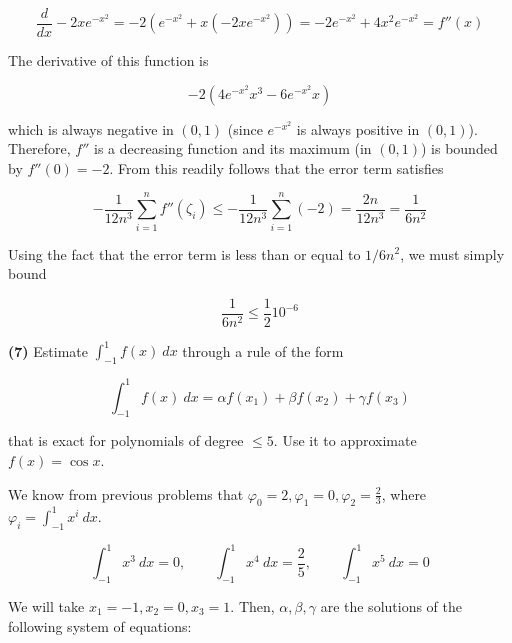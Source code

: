 \documentclass[12pt]{article}
\theoremstyle{definition}
\begin{document}
\begin{equation*}
    \frac{d}{dx} -2xe^{-x^2} = -2\left( e^{-x^2} + x(-2xe^{-x^2}) \right) =
    -2e^{-x^2} + 4x^2e^{-x^2} = f''(x)
\end{equation*}

The derivative of this function is 

\begin{equation*}
    -2(4e^{-x^2}x^3 - 6e^{-x^2}x)
\end{equation*}

which is always negative in $(0, 1)$ (since $e^{-x^2}$ is always positive in
$(0, 1)$). Therefore, $f''$ is a decreasing function and its maximum (in $(0,
1)$) is bounded by $f''(0) = -2$. From this readily follows that the error term
satisfies 

\begin{equation*}
    -\frac{1}{12n^3}\sum_{i=1}^n f''(\zeta_i) \leq -\frac{1}{12n^3}\sum_{i=1}^n
    (-2) = \frac{2n}{12n^3} = \frac{1}{6n^2}
\end{equation*}

Using the fact that the error term is less than or equal to $1 / 6n^2$, we must
simply bound 

\begin{equation*}
    \frac{1}{6n^2} \leq \frac{1}{2}10^{-6}
\end{equation*}

\pagebreak 

\begin{shaded}
    \textbf{(7)} Estimate $\int_{-1}^{1} f(x) ~ dx$ through a rule of the form 

    \begin{equation*}
        \int_{-1}^1 f(x)~ dx = \alpha f(x_1) + \beta f(x_2) + \gamma f(x_3)
    \end{equation*}

    that is exact for polynomials of degree $\leq 5$. Use it to approximate 
    $f(x) = \cos x$.
\end{shaded}


We know from previous problems that $\varphi_0 = 2, \varphi_1 = 0, \varphi_2 =
\frac{2}{3}$, where $\varphi_i = \int_{-1}^1 x^i ~ dx$. 

\begin{equation*}
\int_{-1}^1 x^3 ~ dx = 0, \qquad \int_{-1}^1 x^4 ~ dx = \frac{2}{5}, \qquad
\int_{-1}^1 x^5 ~ dx = 0
\end{equation*}

We will take $x_1 = -1, x_2 = 0, x_3 = 1$. Then, $\alpha, \beta, \gamma$ are the
solutions of the following system of equations: 
\end{document}
